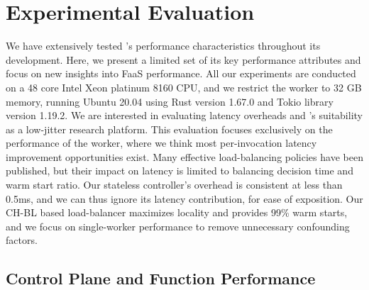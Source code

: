 \section{Experimental Evaluation}
\label{sec:eval}
We have extensively tested \sysname's performance characteristics throughout its development.
Here, we present a limited set of its key performance attributes and focus on new insights into FaaS performance.
All our experiments are conducted on a 48 core Intel Xeon platinum 8160 CPU, and we restrict the worker to 32 GB memory, running Ubuntu 20.04 using Rust version 1.67.0 and Tokio library version 1.19.2.
%
We are interested in evaluating latency overheads and \sysname's suitability as a low-jitter research platform. 
This evaluation focuses exclusively on the performance of the worker, where we think most per-invocation latency improvement opportunities exist.
Many effective load-balancing policies have been published, but their impact on latency is limited to balancing decision time and warm start ratio.
Our stateless controller's overhead is consistent at less than 0.5ms, and we can thus ignore its latency contribution, for ease of exposition.
Our CH-BL based load-balancer maximizes locality and provides 99\% warm starts, and we focus on single-worker performance to remove unnecessary confounding factors.




\subsection{Control Plane and Function Performance}
\label{sec:eval:ovhead}


